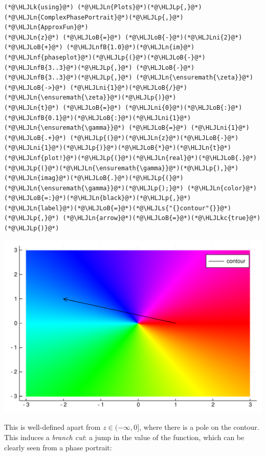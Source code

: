 \documentclass[12pt,a4paper]{article}
\newcommand{\HLJLk}[1]{\textcolor[RGB]{148,91,176}{\textbf{#1}}}
\newcommand{\HLJLkc}[1]{\textcolor[RGB]{59,151,46}{\textit{#1}}}
\newcommand{\HLJLn}[1]{#1}
\newcommand{\HLJLnf}[1]{\textcolor[RGB]{66,102,213}{#1}}
\newcommand{\HLJLs}[1]{\textcolor[RGB]{201,61,57}{#1}}
\newcommand{\HLJLnfB}[1]{\textcolor[RGB]{59,151,46}{#1}}
\newcommand{\HLJLni}[1]{\textcolor[RGB]{59,151,46}{#1}}
\newcommand{\HLJLoB}[1]{\textcolor[RGB]{102,102,102}{\textbf{#1}}}
\newcommand{\HLJLp}[1]{#1}
\begin{document}
\begin{lstlisting}
(*@\HLJLk{using}@*) (*@\HLJLn{Plots}@*)(*@\HLJLp{,}@*) (*@\HLJLn{ComplexPhasePortrait}@*)(*@\HLJLp{,}@*) (*@\HLJLn{ApproxFun}@*)
(*@\HLJLn{z}@*) (*@\HLJLoB{=}@*) (*@\HLJLoB{-}@*)(*@\HLJLni{2}@*) (*@\HLJLoB{+}@*) (*@\HLJLnfB{1.0}@*)(*@\HLJLn{im}@*)
(*@\HLJLnf{phaseplot}@*)(*@\HLJLp{(}@*)(*@\HLJLoB{-}@*)(*@\HLJLnfB{3..3}@*)(*@\HLJLp{,}@*) (*@\HLJLoB{-}@*)(*@\HLJLnfB{3..3}@*)(*@\HLJLp{,}@*) (*@\HLJLn{\ensuremath{\zeta}}@*) (*@\HLJLoB{->}@*) (*@\HLJLni{1}@*)(*@\HLJLoB{/}@*)(*@\HLJLn{\ensuremath{\zeta}}@*)(*@\HLJLp{)}@*)
(*@\HLJLn{t}@*) (*@\HLJLoB{=}@*) (*@\HLJLni{0}@*)(*@\HLJLoB{:}@*)(*@\HLJLnfB{0.1}@*)(*@\HLJLoB{:}@*)(*@\HLJLni{1}@*)
(*@\HLJLn{\ensuremath{\gamma}}@*) (*@\HLJLoB{=}@*) (*@\HLJLni{1}@*) (*@\HLJLoB{.+}@*) (*@\HLJLp{(}@*)(*@\HLJLn{z}@*)(*@\HLJLoB{-}@*)(*@\HLJLni{1}@*)(*@\HLJLp{)}@*)(*@\HLJLoB{*}@*)(*@\HLJLn{t}@*)
(*@\HLJLnf{plot!}@*)(*@\HLJLp{(}@*)(*@\HLJLn{real}@*)(*@\HLJLoB{.}@*)(*@\HLJLp{(}@*)(*@\HLJLn{\ensuremath{\gamma}}@*)(*@\HLJLp{),}@*) (*@\HLJLn{imag}@*)(*@\HLJLoB{.}@*)(*@\HLJLp{(}@*)(*@\HLJLn{\ensuremath{\gamma}}@*)(*@\HLJLp{);}@*) (*@\HLJLn{color}@*)(*@\HLJLoB{=:}@*)(*@\HLJLn{black}@*)(*@\HLJLp{,}@*) (*@\HLJLn{label}@*)(*@\HLJLoB{=}@*)(*@\HLJLs{"{}contour"{}}@*)(*@\HLJLp{,}@*) (*@\HLJLn{arrow}@*)(*@\HLJLoB{=}@*)(*@\HLJLkc{true}@*)(*@\HLJLp{)}@*)
\end{lstlisting}

\includegraphics[width=\linewidth]{figures/Lecture10_1_1.pdf}

This is well-defined apart from $z \in (-\infty,0]$, where there is a pole on the contour. This induces a \emph{branch cut}: a jump in the value of the function, which can be clearly seen from a phase portrait: 
\end{document}
